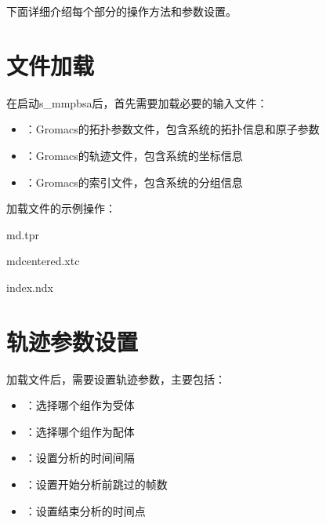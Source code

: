 \documentclass[letterpaper,10pt,english]{sphinxmanual}
\begin{document}
\sphinxAtStartPar
下面详细介绍每个部分的操作方法和参数设置。


\section{文件加载}
\label{\detokenize{usage:id4}}
\sphinxAtStartPar
在启动s\_mmpbsa后，首先需要加载必要的输入文件：
\begin{itemize}
\item {} 
\sphinxAtStartPar
{}：Gromacs的拓扑参数文件，包含系统的拓扑信息和原子参数

\item {} 
\sphinxAtStartPar
{}：Gromacs的轨迹文件，包含系统的坐标信息

\item {} 
\sphinxAtStartPar
{}：Gromacs的索引文件，包含系统的分组信息

\end{itemize}

\sphinxAtStartPar
加载文件的示例操作：

\begin{sphinxVerbatim}[commandchars=\\\{\}]
md.tpr

md\PYGZus{}centered.xtc

index.ndx

\end{sphinxVerbatim}


\section{轨迹参数设置}
\label{\detokenize{usage:id5}}
\sphinxAtStartPar
加载文件后，需要设置轨迹参数，主要包括：
\begin{itemize}
\item {} 
\sphinxAtStartPar
{}：选择哪个组作为受体

\item {} 
\sphinxAtStartPar
{}：选择哪个组作为配体

\item {} 
\sphinxAtStartPar
{}：设置分析的时间间隔

\item {} 
\sphinxAtStartPar
{}：设置开始分析前跳过的帧数

\item {} 
\sphinxAtStartPar
{}：设置结束分析的时间点

\end{itemize}
\end{document}
